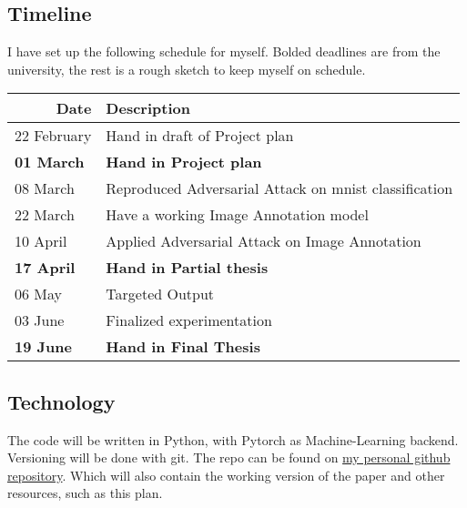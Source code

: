 \documentclass[12pt]{extarticle}
\begin{document}
\subsection{Timeline}
I have set up the following schedule for myself. Bolded deadlines are from the university, the rest is a rough sketch to keep myself on schedule.
\begin{table}[h]
    \begin{tabular}{|l|l|}
        \hline
        \multicolumn{1}{|r|}{Date} & Description                                           \\ \hline
        22 February                & Hand in draft of Project plan                         \\ \hline
        \textbf{01 March}          & \textbf{Hand in Project plan}                         \\ \hline
        08 March                   & Reproduced Adversarial Attack on mnist classification \\ \hline
        22 March                   & Have a working Image Annotation model                 \\ \hline
        10 April                   & Applied Adversarial Attack on Image Annotation        \\ \hline
        \textbf{17 April}          & \textbf{Hand in Partial thesis}                       \\ \hline
        06 May                     & Targeted Output                                       \\ \hline
        03 June                    & Finalized experimentation                             \\ \hline
        \textbf{19 June}           & \textbf{Hand in Final Thesis}                         \\ \hline
    \end{tabular}
\end{table}


\subsection{Technology}
The code will be written in Python, with Pytorch as Machine-Learning backend.
Versioning will be done with git.
The repo can be found on \href{https://github.com/dikvangenuchten/bep-adversarial-image-annotation}{my personal github repository}. Which will also contain the working version of the paper and other resources, such as this plan.




\end{document}

